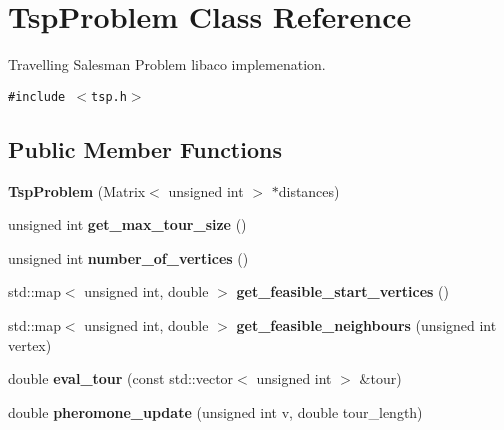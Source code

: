 \hypertarget{classTspProblem}{
\section{TspProblem Class Reference}
\label{classTspProblem}
}
Travelling Salesman Problem libaco implemenation.  


{\tt \#include $<$tsp.h$>$}

\subsection*{Public Member Functions}
\begin{CompactItemize}
\item 
\hypertarget{classTspProblem_a83235d8f45df29e46310f200da1874f}{
\textbf{TspProblem} (Matrix$<$ unsigned int $>$ $\ast$distances)}
\label{classTspProblem_a83235d8f45df29e46310f200da1874f}

\item 
\hypertarget{classTspProblem_23b73f500a498018220b43387d4ce9b7}{
unsigned int \textbf{get\_\-max\_\-tour\_\-size} ()}
\label{classTspProblem_23b73f500a498018220b43387d4ce9b7}

\item 
\hypertarget{classTspProblem_c395626652825be2333401312b31d556}{
unsigned int \textbf{number\_\-of\_\-vertices} ()}
\label{classTspProblem_c395626652825be2333401312b31d556}

\item 
\hypertarget{classTspProblem_06b643e4330618140448ea40866eaa4c}{
std::map$<$ unsigned int, double $>$ \textbf{get\_\-feasible\_\-start\_\-vertices} ()}
\label{classTspProblem_06b643e4330618140448ea40866eaa4c}

\item 
\hypertarget{classTspProblem_24e9a8320098c090fdbe193106cce60d}{
std::map$<$ unsigned int, double $>$ \textbf{get\_\-feasible\_\-neighbours} (unsigned int vertex)}
\label{classTspProblem_24e9a8320098c090fdbe193106cce60d}

\item 
\hypertarget{classTspProblem_5e2bbd95618635e2a23082d66646cfc9}{
double \textbf{eval\_\-tour} (const std::vector$<$ unsigned int $>$ \&tour)}
\label{classTspProblem_5e2bbd95618635e2a23082d66646cfc9}

\item 
\hypertarget{classTspProblem_69027eff00a09f8791886cb4b74079cf}{
double \textbf{pheromone\_\-update} (unsigned int v, double tour\_\-length)}
\label{classTspProblem_69027eff00a09f8791886cb4b74079cf}


\end{CompactItemize}
